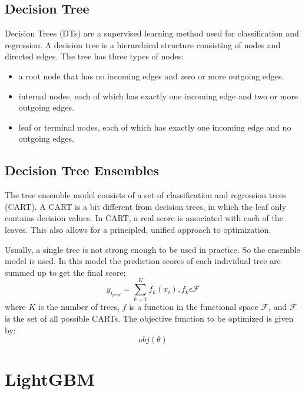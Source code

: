 \documentclass[a4paper, oneside]{book}
\begin{document}
			\subsection{Decision Tree}
			Decision Trees (DTs) are a supervised learning method used for classification and regression.
			\cite{Decision Tree}A decision tree is a hierarchical structure consisting of nodes and directed edges. The tree has three types of nodes:
			\begin{itemize}
				\item a root node that has no incoming edges and zero or more outgoing edges.
				\item internal nodes, each of which has exactly one incoming edge and two or more outgoing edges.
				\item leaf or terminal nodes, each of which has exactly one incoming edge and no outgoing edges.
			\end{itemize}
			
			\subsection{Decision Tree Ensembles}
			\cite{GBT}The tree ensemble model consists of a set of classification and regression trees (CART). A CART is a bit different from decision trees, in which the leaf only contains decision values. In CART, a real score is associated with each of the leaves. This also allows for a principled, unified approach to optimization.
			
			Usually, a single tree is not strong enough to be used in practice. So the ensemble model is used. In this model the prediction scores of each individual tree are summed up to get the final score:
			$$
			y_{i_{pred}} = \sum_{k=1}^{K} f_k(x_i), f_k \epsilon \mathcal{F}
			$$
			where $K$ is the number of trees, $f$ is a function in the functional space $\mathcal{F}$, and $\mathcal{F}$ is the set of all possible CARTs. The objective function to be optimized is given by:
			$$
			obj(\theta)
			$$
			
		\section{LightGBM}
		
		
		
		
		
\end{document}
